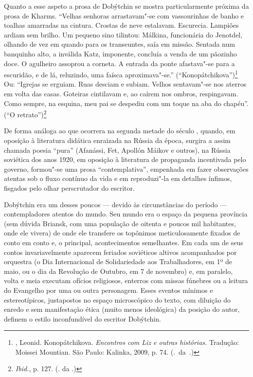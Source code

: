 Quanto a esse aspeto a prosa de Dobýtchin se mostra particularmente
próxima da prosa de Kharms. ``Velhas senhoras arrastavam"-se com
vassourinhas de banho e toalhas amarradas na cintura. Crostas de neve
estalavam. Escurecia. Lampiões ardiam sem brilho. Um pequeno sino
tilintou: Málkina, funcionária do Jenotdel, olhando de vez em quando
para os transeuntes, saía em missão. Sentada num banquinho alto, a
inválida Katz, imponente, concluía a venda de um pãozinho doce. O
agulheiro assoprou a corneta. A entrada da ponte afastava"-se para a
escuridão, e de lá, reluzindo, uma faísca aproximava"-se.''
(``Konopátchikova'')\footnote{\scalebox{.8}{DOBÝTCHIN}, Leonid. Konopátchikova.
  \emph{Encontros com Liz e outras histórias.} Tradução: Moissei
  Mountian. São Paulo: Kalinka, 2009, p. 74. (\scalebox{.8}{N}.~da~\scalebox{.8}{E}.)} Ou: ``Igrejas
se erguiam. Ruas desciam e subiam. Velhos sentavam"-se nos aterros em
volta das casas. Goteiras cintilavam e, ao caírem nos ombros,
respingavam. Como sempre, na esquina, meu pai se despediu com um toque
na aba do chapéu''. (``O retrato'')\footnote{\emph{Ibid.}, p. 127. (\scalebox{.8}{N}.
  da \scalebox{.8}{E}.)}

De forma análoga ao que ocorrera na segunda metade do século \scalebox{.8}{XIX},
quando, em oposição à literatura didática enraizada na Rússia da época,
surgira a assim chamada poesia ``pura'' (Afanássi, Fet, Apollón Máikov e
outros), na Rússia soviética dos anos 1920, em oposição à literatura de
propaganda incentivada pelo governo, formou"-se uma prosa
``contemplativa'', empenhada em fazer observações atentas sob o fluxo
contínuo da vida e em reproduzi"-la em detalhes ínfimos, fisgados pelo
olhar perscrutador do escritor.

Dobýtchin era um desses poucos --- devido às circunstâncias do período
--- contempladores atentos do mundo. Seu mundo era o espaço da pequena
província (sem dúvida Briansk, com uma população de oitenta e poucos mil
habitantes, onde ele vivera) de onde ele transfere os topônimos
meticulosamente fixados de conto em conto e, o principal, acontecimentos
semelhantes. Em cada um de seus contos invariavelmente aparecem feriados
soviéticos altivos acompanhados por orquestra (o Dia Internacional de
Solidariedade aos Trabalhadores, em 1º de maio, ou o dia da Revolução de
Outubro, em 7 de novembro) e, em paralelo, volta e meia executam ofícios
religiosos, enterros com missas fúnebres ou a leitura do Evangelho por
uma ou outra personagem. Esses eventos mínimos e estereotípicos,
justapostos no espaço microscópico do texto, com diluição do enredo e
sem manifestação ética (muito menos ideológica) da posição do autor,
definem o estilo inconfundível do escritor Dobýtchin.


